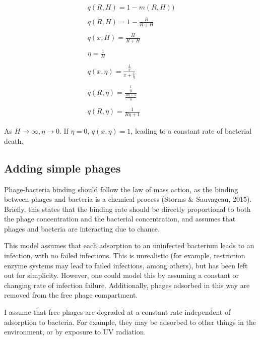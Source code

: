 \documentclass{article}
\begin{document}
\begin{center}
\begin {equation} 
\begin{split}
q(R, H) = 1-m(R, H)) \\ \\ q(R, H) = 1 - \frac{R}{R+H}\\ \\  q(x, H) = \frac{H}{R+H} \\ \\ \eta = \frac{1}{H} \\ \\ q(x, \eta) = \frac{\frac{1}{\eta}}{x+\frac{1}{\eta}} \\ \\ q(R, \eta) = \frac{\frac{1}{\eta}}{\frac{R\eta + 1}{\eta}} \\ \\ q(R, \eta) = \frac{1}{R\eta + 1} 
\end{split}
\end {equation}
\end{center}

As $H \rightarrow \infty, \eta \rightarrow 0$. If $\eta=0$, $q(x, \eta) = 1$, leading to a constant rate of bacterial death. 

\subsection{Adding simple phages}
Phage-bacteria binding should follow the law of mass action, as the binding between phages and bacteria is a chemical process (Storms $\&$ Sauvageau, 2015). Briefly, this states that the binding rate should be directly proportional to both the phage concentration and the bacterial concentration, and assumes that phages and bacteria are interacting due to chance.

This model assumes that each adsorption to an uninfected bacterium leads to an infection, with no failed infections. This is unrealistic (for example, restriction enzyme systems may lead to failed infections, among others), but has been left out for simplicity. However, one could model this by assuming a constant or changing rate of infection failure. Additionally, phages adsorbed in this way are removed from the free phage compartment. 

I assume that free phages are degraded at a constant rate independent of adsorption to bacteria. For example, they may be adsorbed to other things in the environment, or by exposure to UV radiation. 
\end{document}
